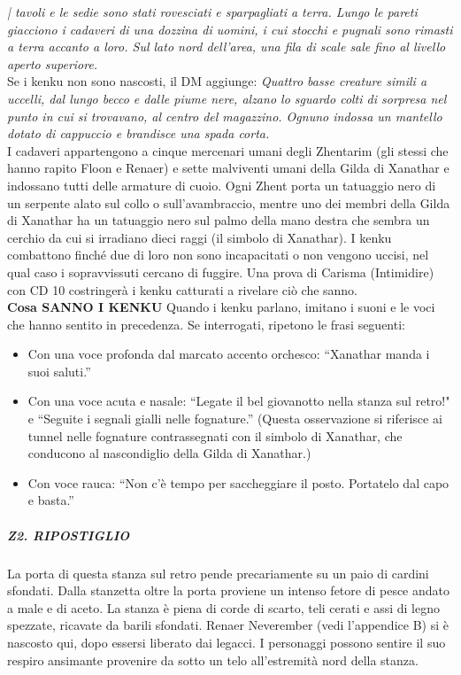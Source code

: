 \documentclass{article}
\begin{document}
\textit{| tavoli e le sedie sono stati rovesciati e sparpagliati a
terra. Lungo le pareti giacciono i cadaveri di una dozzina
di uomini, i cui stocchi e pugnali sono rimasti a terra
accanto a loro. Sul lato nord dell'area, una fila di scale
sale fino al livello aperto superiore.} \\
Se i kenku non sono nascosti, il DM aggiunge:
\textit{Quattro basse creature simili a uccelli, dal lungo becco
e dalle piume nere, alzano lo sguardo colti di sorpresa
nel punto in cui si trovavano, al centro del magazzino.
Ognuno indossa un mantello dotato di cappuccio e
brandisce una spada corta.}\\

I cadaveri appartengono a cinque mercenari umani degli
Zhentarim (gli stessi che hanno rapito Floon e Renaer) e
sette malviventi umani della Gilda di Xanathar e indossano
tutti delle armature di cuoio. Ogni Zhent porta un tatuaggio
nero di un serpente alato sul collo o sull'avambraccio, mentre
uno dei membri della Gilda di Xanathar ha un tatuaggio nero
sul palmo della mano destra che sembra un cerchio da cui si
irradiano dieci raggi (il simbolo di Xanathar).
I kenku combattono finché due di loro non sono
incapacitati o non vengono uccisi, nel qual caso i
sopravvissuti cercano di fuggire. Una prova di Carisma
(Intimidire) con CD 10 costringerà i kenku catturati a
rivelare ciò che sanno. \\

\textbf{Cosa SANNO I KENKU} Quando i kenku parlano, imitano i suoni e le voci che
hanno sentito in precedenza. Se interrogati, ripetono le
frasi seguenti: 
\begin{itemize}
    \item Con una voce profonda dal marcato accento orchesco:
    “Xanathar manda i suoi saluti.”
    \item Con una voce acuta e nasale: “Legate il bel giovanotto
    nella stanza sul retro!" e “Seguite i segnali gialli
    nelle fognature.” (Questa osservazione si riferisce ai
    tunnel nelle fognature contrassegnati con il simbolo di
    Xanathar, che conducono al nascondiglio della Gilda di
    Xanathar.)
    \item Con voce rauca: “Non c'è tempo per saccheggiare il
    posto. Portatelo dal capo e basta.”

\end{itemize}


                        \subparagraph{Z2. RIPOSTIGLIO}
La porta di questa stanza sul retro pende precariamente
su un paio di cardini sfondati. Dalla stanzetta oltre la
porta proviene un intenso fetore di pesce andato a male e
di aceto. La stanza è piena di corde di scarto, teli cerati e
assi di legno spezzate, ricavate da barili sfondati. Renaer
Neverember (vedi l’appendice B) si è nascosto qui, dopo
essersi liberato dai legacci. I personaggi possono sentire
il suo respiro ansimante provenire da sotto un telo
all'estremità nord della stanza.
\end{document}
